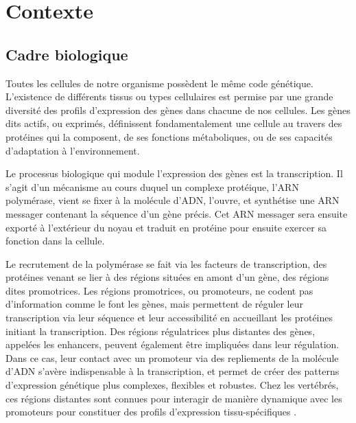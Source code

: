 \documentclass[french]{llncs}
\begin{document}
\clearpage


\newpage


\section{Contexte} \label{intro}

\subsection{Cadre biologique}

Toutes les cellules de notre organisme possèdent le même code génétique. L'existence de différents tissus ou types cellulaires est permise par une grande diversité des profils d'expression des gènes dans chacune de nos cellules. Les gènes dits actifs, ou exprimés, définissent fondamentalement une cellule au travers des protéines qui la composent, de ses fonctions métaboliques, ou de ses capacités d'adaptation à l'environnement.

Le processus biologique qui module l'expression des gènes est la transcription.
Il s'agit d'un mécanisme au cours duquel un complexe protéique, l'ARN polymérase, vient se fixer à la molécule d'ADN, l'ouvre, et synthétise une ARN messager contenant la séquence d'un gène précis. Cet ARN messager sera ensuite exporté à l'extérieur du noyau et traduit en protéine pour ensuite exercer sa fonction dans la cellule.

Le recrutement de la polymérase se fait via les facteurs de transcription, des protéines venant se lier à des régions situées en amont d'un gène, des régions dites promotrices. Les régions promotrices, ou promoteurs, ne codent pas d'information comme le font les gènes, mais permettent de réguler leur transcription via leur séquence et leur accessibilité en accueillant les protéines initiant la transcription.
Des régions régulatrices plus distantes des gènes, appelées les enhancers, peuvent également être impliquées dans leur régulation. Dans ce cas, leur contact avec un promoteur via des repliements de la molécule d'ADN s'avère indispensable à la transcription, et permet de créer des patterns d'expression génétique plus complexes, flexibles et robustes. Chez les vertébrés, ces régions distantes sont connues pour interagir de manière dynamique avec les promoteurs pour constituer des profils d'expression tissu-spécifiques \cite{robson_regulatory_2019}. 
\end{document}
